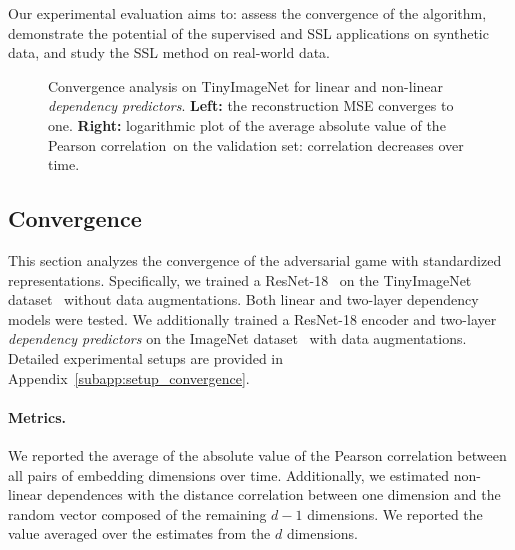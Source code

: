 Our experimental evaluation aims to: assess the convergence of the algorithm, 
demonstrate the potential of the supervised and SSL applications on synthetic data, 
and study the SSL method on real-world data. 

\begin{figure} %
    \centering %
    \begin{subfigure}{0.495\columnwidth}
        \def\svgwidth{\textwidth}
        {\tiny }
    \end{subfigure}
    \hfill
    \begin{subfigure}{0.495\columnwidth}
        \def\svgwidth{\textwidth}
        {\tiny }
    \end{subfigure}%
    \vspace{-8px}
    \caption{Convergence analysis on TinyImageNet for linear and non-linear \textit{dependency predictors}. \textbf{Left:} the reconstruction MSE converges to one. \textbf{Right:} logarithmic plot of the average absolute value of the Pearson correlation\protect\footnotemark~on the validation set: correlation decreases over time.}
    \label{fig:TIN_convergence}  %
\end{figure}


\subsection{Convergence} \label{sec:results_convergence}

This section analyzes the convergence of the adversarial game with standardized representations. 
Specifically, we trained a ResNet-18~\citep{he2016resnet} on the TinyImageNet dataset~\citep{le2015tinyimagenet} without data augmentations. 
Both linear and two-layer dependency models were tested. 
We additionally trained a ResNet-18 encoder and two-layer \textit{dependency predictors} on the ImageNet dataset~\citep{deng2009imagenet} with data augmentations. Detailed experimental setups are provided in Appendix~\ref{subapp:setup_convergence}.

\paragraph{Metrics.} We reported the average of the absolute value of the Pearson correlation between all pairs of embedding dimensions over time. 
Additionally, we estimated non-linear dependences with the distance correlation between one dimension and the random vector composed of the remaining $d-1$ dimensions. We reported the value averaged over the estimates from the $d$ dimensions. 

